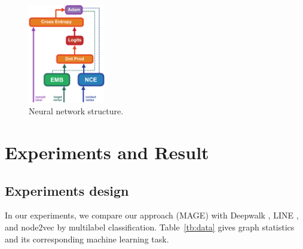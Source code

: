 \documentclass[letterpaper]{article}
\begin{document}
            \begin{figure}
                \centering
                \includegraphics[width=0.3\textwidth]{fig8_nn}
                \caption{Neural network structure.}
                \label{fig:mneg}
            \end{figure}

    \section{Experiments and Result}

        \subsection{Experiments design}
            
            In our experiments, we compare our approach (MAGE) with Deepwalk \cite{deepwalk}, 
            LINE \cite{line}, and node2vec \cite{node2vec} by multilabel classification. 
            Table~\ref{tb:data} gives graph statistics and its corresponding machine learning task. 

            \begin{table}
                \centering
                \label{tb:data}
                \caption{Dataset statistics}
            \end{table}
\end{document}
